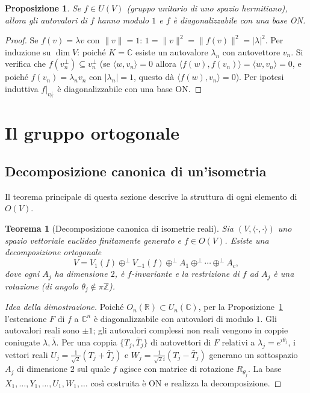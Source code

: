 \documentclass[11pt, a4paper]{book}
\theoremstyle{definition}
\theoremstyle{plain}
\newtheorem{teorema}[definizione]{Teorema}
\newtheorem{proposizione}[definizione]{Proposizione}
\theoremstyle{remark}
\newcommand{\Z}{\mathbb{Z}}
\newcommand{\R}{\mathbb{R}}
\newcommand{\C}{\mathbb{C}}
\begin{document}
\begin{proposizione}
\label{prop:unitario-autovalori}
Se $f \in U(V)$ (gruppo unitario di uno spazio hermitiano), allora gli autovalori di $f$ hanno modulo $1$ e $f$ è diagonalizzabile con una base ON.
\end{proposizione}

\begin{proof}
Se $f(v) = \lambda v$ con $\|v\| = 1$: $1 = \|v\|^2 = \|f(v)\|^2 = |\lambda|^2$. Per induzione su $\dim V$: poiché $K = \C$ esiste un autovalore $\lambda_n$ con autovettore $v_n$. Si verifica che $f(v_n^\perp) \subseteq v_n^\perp$ (se $\langle w,v_n\rangle = 0$ allora $\langle f(w),f(v_n)\rangle = \langle w,v_n\rangle = 0$, e poiché $f(v_n) = \lambda_n v_n$ con $|\lambda_n|=1$, questo dà $\langle f(w),v_n\rangle = 0$). Per ipotesi induttiva $f|_{v_n^\perp}$ è diagonalizzabile con una base ON.
\end{proof}

\section{Il gruppo ortogonale}
\label{sec:gruppo-ortogonale}

\subsection{Decomposizione canonica di un'isometria}

Il teorema principale di questa sezione descrive la struttura di ogni elemento di $O(V)$.

\begin{teorema}[Decomposizione canonica di isometrie reali]
\label{thm:decomp-isometrie}
Sia $(V,\langle\cdot,\cdot\rangle)$ uno spazio vettoriale euclideo finitamente generato e $f \in O(V)$. Esiste una decomposizione ortogonale
\[
  V = V_1(f) \oplus^\perp V_{-1}(f) \oplus^\perp A_1 \oplus^\perp \cdots \oplus^\perp A_c,
\]
dove ogni $A_j$ ha dimensione $2$, è $f$-invariante e la restrizione di $f$ ad $A_j$ è una rotazione (di angolo $\theta_j \notin \pi\Z$).
\end{teorema}

\begin{proof}[Idea della dimostrazione]
Poiché $O_n(\R) \subset U_n(\C)$, per la Proposizione~\ref{prop:unitario-autovalori} l'estensione $F$ di $f$ a $\C^n$ è diagonalizzabile con autovalori di modulo $1$. Gli autovalori reali sono $\pm 1$; gli autovalori complessi non reali vengono in coppie coniugate $\lambda, \bar\lambda$. Per una coppia $\{T_j, \bar T_j\}$ di autovettori di $F$ relativi a $\lambda_j = e^{i\theta_j}$, i vettori reali $U_j = \frac{1}{\sqrt{2}}(T_j+\bar T_j)$ e $W_j = \frac{1}{\sqrt{2}i}(T_j-\bar T_j)$ generano un sottospazio $A_j$ di dimensione $2$ sul quale $f$ agisce con matrice di rotazione $R_{\theta_j}$. La base $X_1,\ldots,Y_1,\ldots,U_1,W_1,\ldots$ così costruita è ON e realizza la decomposizione.
\end{proof}
\end{document}
